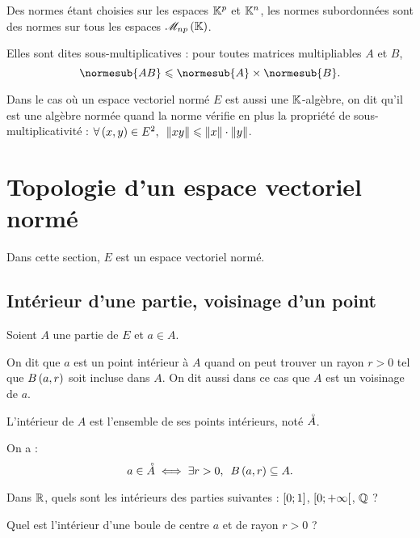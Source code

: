 \begin{prop}
Des normes étant choisies sur les espaces \(\mathbb{K}^p\) et \(\mathbb{K}^n\), les normes subordonnées sont des normes sur tous les espaces \(\M{np}\).

Elles sont dites sous-multiplicatives : pour toutes matrices multipliables \(A\) et \(B\), \[\normesub{AB}\leq\normesub{A}\times\normesub{B}.\]
\end{prop}

\begin{rem}
Dans le cas où un espace vectoriel normé \(E\) est aussi une \(\mathbb{K}\)-algèbre, on dit qu'il est une algèbre normée quand la norme vérifie en plus la propriété de sous-multiplicativité : \(\quantifs{\forall\paren{x,y}\in E^2}\norme{xy}\leq\norme{x}\cdot\norme{y}\).
\end{rem}

\section{Topologie d'un espace vectoriel normé}

Dans cette section, \(E\) est un espace vectoriel normé.

\subsection{Intérieur d'une partie, voisinage d'un point}

\begin{defi}
Soient \(A\) une partie de \(E\) et \(a\in A\).

On dit que \(a\) est un point intérieur à \(A\) quand on peut trouver un rayon \(r>0\) tel que \(B\left(a,r\right)\) soit incluse dans \(A\). On dit aussi dans ce cas que \(A\) est un voisinage de \(a\).

L'intérieur de \(A\) est l'ensemble de ses points intérieurs, noté \(\accentset{\circ}{A}\).

On a : \[a\in\interieur{A}\ssi\quantifs{\exists r>0}\bouleo{a}{r}\subset A.\]
\end{defi}

\begin{exo}
Dans \(\mathbb{R}\), quels sont les intérieurs des parties suivantes : \(\left[0;1\right]\), \(\left[0;+\infty\right[\), \(\mathbb{Q}\) ?
\end{exo}

\begin{exo}
Quel est l'intérieur d'une boule de centre \(a\) et de rayon \(r>0\) ?
\end{exo}

